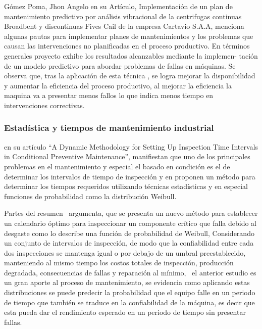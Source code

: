 \documentclass[
  11pt,
  bookmarksnumbered]{article}
\begin{document}
Gómez Poma, Jhon Angelo en su Artículo, Implementación de un plan de mantenimiento predictivo por análisis vibracional de la centrifugas continuas Broadbent y discontinuas Fives Cail de la empresa Cartavio S.A.A, menciona algunas pautas para implementar planes de mantenimientos y los problemas que causan las intervenciones no planificadas en el proceso productivo.
En términos generales proyecto exhibe los resultados alcanzables mediante la implemen- tación de un modelo predictivo para abordar problemas de fallas en máquinas.
Se observa que, tras la aplicación de esta técnica \textcite{gomez2022implementacion}, se logra mejorar la disponibilidad y aumentar la eficiencia del proceso productivo, al mejorar la eficiencia la maquina va a presentar menos fallos lo que indica menos tiempo en intervenciones correctivas.

\hypertarget{estaduxedstica-y-tiempos-de-mantenimiento-industrial}{%
\subsubsection{Estadística y tiempos de mantenimiento industrial}\label{estaduxedstica-y-tiempos-de-mantenimiento-industrial}}

\textcite{Assis2021} en su artículo ``A Dynamic Methodology for Setting Up Inspection Time Intervals in Conditional Preventive Maintenance'', manifiestan que uno de los principales problemas en el mantenimiento y especial el basado en condición es el de determinar los intervalos de tiempo de inspección y en proponen un método para determinar los tiempos requeridos utilizando técnicas estadísticas y en especial funciones de probabilidad como la distribución Weibull.

Partes del resumen~ argumenta, que se presenta un nuevo método para establecer un calendario óptimo para inspeccionar un componente crítico que falla debido al desgaste como lo describe una función de probabilidad de Weibull, Considerando un conjunto de intervalos de inspección, de modo que la confiabilidad entre cada dos inspecciones se mantenga igual o por debajo de un umbral preestablecido, manteniendo al mismo tiempo los costos totales de inspección, producción degradada, consecuencias de fallas y reparación al mínimo, ~el anterior estudio es un gran aporte al proceso de mantenimiento, se evidencia como aplicando estas distribuciones se puede predecir la probabilidad que el equipo falle en un periodo de tiempo que también se traduce en la confiabilidad de la máquina, es decir que esta pueda dar el rendimiento esperado en un periodo de tiempo sin presentar fallas.
\end{document}
